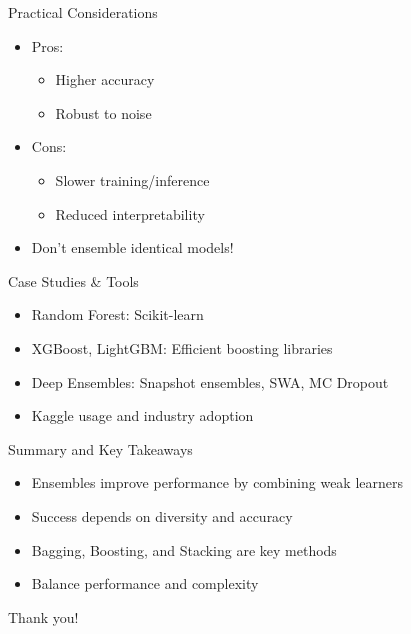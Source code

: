 \documentclass{beamer}
\begin{document}
\begin{frame}{Practical Considerations}
\begin{itemize}
    \item Pros:
    \begin{itemize}
        \item Higher accuracy
        \item Robust to noise
    \end{itemize}
    \item Cons:
    \begin{itemize}
        \item Slower training/inference
        \item Reduced interpretability
    \end{itemize}
    \item Don’t ensemble identical models!
\end{itemize}
\end{frame}

\begin{frame}{Case Studies & Tools}
\begin{itemize}
    \item Random Forest: Scikit-learn
    \item XGBoost, LightGBM: Efficient boosting libraries
    \item Deep Ensembles: Snapshot ensembles, SWA, MC Dropout
    \item Kaggle usage and industry adoption
\end{itemize}
\end{frame}

\begin{frame}{Summary and Key Takeaways}
\begin{itemize}
    \item Ensembles improve performance by combining weak learners
    \item Success depends on diversity and accuracy
    \item Bagging, Boosting, and Stacking are key methods
    \item Balance performance and complexity
\end{itemize}
\end{frame}


\begin{frame}[standout]
    Thank you!
\end{frame}
\end{document}

